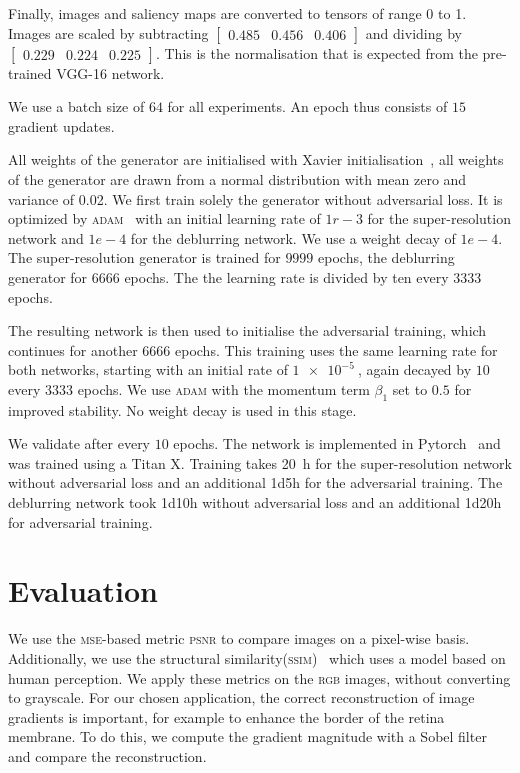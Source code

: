 \documentclass{scrartcl}
\begin{document}
Finally, images and saliency maps are converted to tensors of range 0 to 1.
Images are scaled by subtracting
\(
\begin{bmatrix}
 0.485 & 0.456 & 0.406 
\end{bmatrix}
\)
and dividing by
\(
\begin{bmatrix}
0.229 & 0.224& 0.225
\end{bmatrix}
\).
This is the normalisation that is expected from the pre-trained VGG-16 network.

We use a batch size of $64$ for all experiments.
An epoch thus consists of $15$ gradient updates.

All weights of the generator are initialised with Xavier initialisation~\cite{Xavier}, all weights of the generator are drawn from a normal distribution with mean zero and variance of 0.02. 
We first train solely the generator without adversarial loss.
It is optimized by \textsc{adam}~\cite{Adam} with an initial learning rate of $1r-3$ for the super-resolution network and $1e-4$ for the deblurring network.
We use a weight decay of $1e-4$.
The super-resolution generator is trained for $9999$ epochs, the deblurring generator for $6666$ epochs.
The the learning rate is divided by ten every $3333$ epochs.

The resulting network is then used to initialise the adversarial training, which continues for another $6666$ epochs.
This training uses the same learning rate for both networks, starting with an initial rate of $\SI{1e-5}{}$, again decayed by $10$ every $3333$ epochs.
We use \textsc{adam} with the momentum term $\beta_1$ set to $0.5$ for improved stability.
No weight decay is used in this stage.

We validate after every $10$ epochs.
The network is implemented in Pytorch~\cite{Pytorch} and was trained using a Titan X.
Training takes \SI{20}{\hour} for the super-resolution network without adversarial loss and an additional 1d5h for the adversarial training.
The deblurring network took 1d10h without adversarial loss and an additional 1d20h for adversarial training.

\section{Evaluation}
We use the \textsc{mse}-based metric \textsc{psnr} to compare images on a pixel-wise basis.
Additionally, we use the structural similarity(\textsc{ssim})~\cite{Ssim} which uses a model based on human perception.
We apply these metrics on the \textsc{rgb} images, without converting to grayscale.
For our chosen application, the correct reconstruction of image gradients is important, for example to enhance the border of the retina membrane.
To do this, we compute the gradient magnitude with a Sobel filter and compare the reconstruction.
\end{document}
